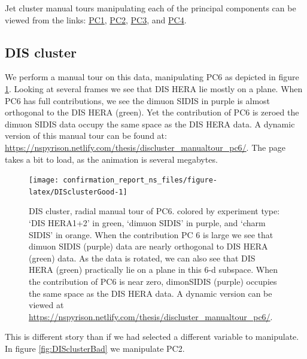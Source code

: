 \documentclass{monashthesis}
\begin{document}
Jet cluster manual tours manipulating each of the principal components
can be viewed from the links:
\href{https://nspyrison.netlify.com/thesis/jetcluster_manualtour_pc1/}{PC1},
\href{https://nspyrison.netlify.com/thesis/jetcluster_manualtour_pc2/}{PC2},
\href{https://nspyrison.netlify.com/thesis/jetcluster_manualtour_pc3/}{PC3},
and
\href{https://nspyrison.netlify.com/thesis/jetcluster_manualtour_pc4/}{PC4}.

\subsection{DIS cluster}\label{dis-cluster}

We perform a manual tour on this data, manipulating PC6 as depicted in
figure \ref{fig:DISclusterGood}. Looking at several frames we see that
DIS HERA lie mostly on a plane. When PC6 has full contributions, we see
the dimuon SIDIS in purple is almost orthogonal to the DIS HERA (green).
Yet the contribution of PC6 is zeroed the dimuon SIDIS data occupy the
same space as the DIS HERA data. A dynamic version of this manual tour
can be found at:
\url{https://nspyrison.netlify.com/thesis/discluster_manualtour_pc6/}.
The page takes a bit to load, as the animation is several megabytes.











\begin{figure}

{\centering \texttt{[image: confirmation\_report\_ns\_files/figure-latex/DISclusterGood-1]} 

}

\caption{DIS cluster, radial manual tour of PC6. colored
by experiment type: `DIS HERA1+2' in green, `dimuon SIDIS' in purple,
and `charm SIDIS' in orange. When the contribution PC 6 is large we see
that dimuon SIDIS (purple) data are nearly orthogonal to DIS HERA
(green) data. As the data is rotated, we can also see that DIS HERA
(green) practically lie on a plane in this 6-d subspace. When the
contribution of PC6 is near zero, dimonSIDIS (purple) occupies the same
space as the DIS HERA data. A dynamic version can be viewed at
\url{https://nspyrison.netlify.com/thesis/discluster_manualtour_pc6/}.}\label{fig:DISclusterGood}
\end{figure}

This is different story than if we had selected a different variable to
manipulate. In figure \ref{fig:DISclusterBad} we manipulate PC2.
\end{document}
